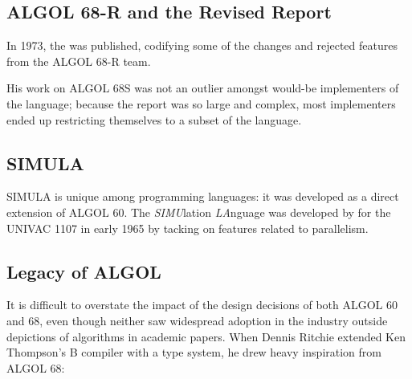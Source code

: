 \subsection{ALGOL 68-R and the Revised Report}

In 1973, the  was published,
codifying some of the changes and rejected features from the ALGOL 68-R team.


His work on ALGOL 68S was not an outlier amongst would-be implementers of the
language; because the report was so large and complex, most
implementers ended up restricting themselves to a subset of the language.

\subsection{SIMULA}

SIMULA is unique among programming languages: it was developed
as a direct extension of ALGOL 60.
The \textit{SIMU}lation \textit{LA}nguage was developed by 
for the UNIVAC 1107 in early 1965 by tacking on features related to parallelism.





\subsection{Legacy of ALGOL}

It is difficult to overstate the impact of the design decisions of both ALGOL 60 and 68,
even though neither saw widespread adoption in the industry outside depictions of
algorithms in academic papers.
When Dennis Ritchie extended Ken Thompson's B compiler with a type system, he drew heavy
inspiration from ALGOL 68:

